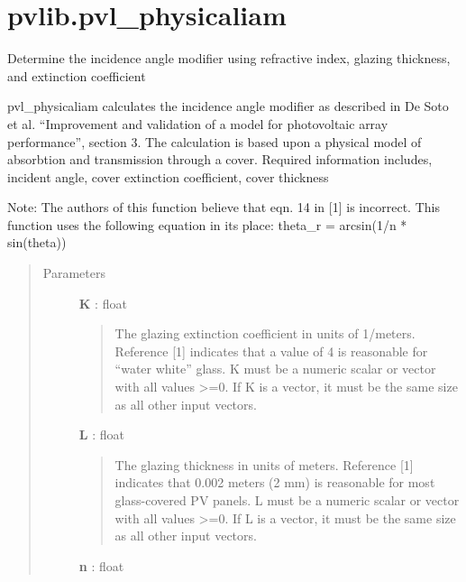 \documentclass[letterpaper,10pt,english]{sphinxmanual}
\begin{document}
\section{pvlib.pvl\_physicaliam}
\label{stubs/pvlib.pvl_physicaliam:pvlib-pvl-physicaliam}\label{stubs/pvlib.pvl_physicaliam::doc}

\begin{fulllineitems}
\label{stubs/pvlib.pvl_physicaliam:pvlib.pvl_physicaliam}
Determine the incidence angle modifier using refractive 
index, glazing thickness, and extinction coefficient

pvl\_physicaliam calculates the incidence angle modifier as described in
De Soto et al. ``Improvement and validation of a model for photovoltaic
array performance'', section 3. The calculation is based upon a physical
model of absorbtion and transmission through a cover. Required
information includes, incident angle, cover extinction coefficient,
cover thickness

Note: The authors of this function believe that eqn. 14 in {[}1{]} is
incorrect. This function uses the following equation in its place:
theta\_r = arcsin(1/n * sin(theta))
\begin{quote}\begin{description}
\item[{Parameters}] \leavevmode
\textbf{K} : float
\begin{quote}

The glazing extinction coefficient in units of 1/meters. Reference
{[}1{]} indicates that a value of  4 is reasonable for ``water white''
glass. K must be a numeric scalar or vector with all values \textgreater{}=0. If K
is a vector, it must be the same size as all other input vectors.
\end{quote}

\textbf{L} : float
\begin{quote}

The glazing thickness in units of meters. Reference {[}1{]} indicates
that 0.002 meters (2 mm) is reasonable for most glass-covered
PV panels. L must be a numeric scalar or vector with all values \textgreater{}=0. 
If L is a vector, it must be the same size as all other input vectors.
\end{quote}

\textbf{n} : float
\begin{quote}


\end{quote}
\end{description}
\end{quote}
\end{fulllineitems}
\end{document}
